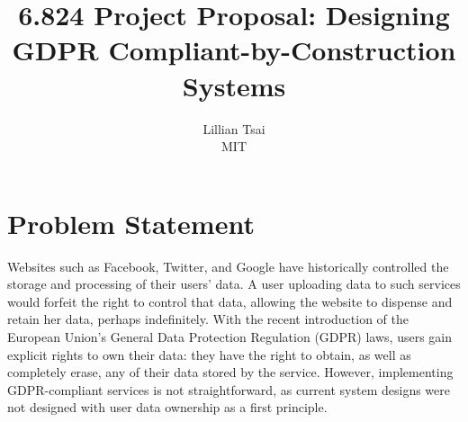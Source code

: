 \documentclass[letterpaper,twocolumn,10pt]{article}
\begin{document}

\date{}

\title{\Large \bf 6.824 Project Proposal: Designing GDPR Compliant-by-Construction Systems}

\author{
{\rm Lillian Tsai}\\
MIT
} %

\maketitle


\section{Problem Statement}
Websites such as Facebook, Twitter, and Google have historically controlled the storage and processing of their users' data.
A user uploading data to such services would forfeit the right to control that data, allowing the website to dispense and retain her data, perhaps indefinitely.
With the recent introduction of the European Union's General Data Protection Regulation (GDPR) laws, 
users gain explicit rights to own their data: they have the right to obtain, as well as completely erase, any of their data stored by the service. However, implementing GDPR-compliant services is not straightforward, as current system designs were not designed with user data ownership as a first principle.
\end{document}
